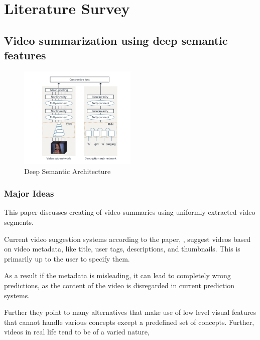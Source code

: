 
\chapter{Literature Survey} 
\label{Chapter1_2} 

\section{Video summarization using deep semantic features 
\texorpdfstring{\cite{otani_2016_video}}{}}

%			
			\begin{figure}[ht]
				\centering
					\includegraphics[width=0.5\textwidth]{P1Arch}
				\caption{Deep Semantic Architecture}
				\label{fig:p1arch}
			\end{figure}
			
			
			\subsection{Major Ideas}
				 This paper discusses creating of video summaries using uniformly extracted video segments.
				 
				 Current video suggestion systems according to the paper, \cite{otani_2016_video}, suggest videos based on video metadata, like title, user tags, descriptions, and thumbnails. This is primarily up to the user to specify them.

				As a result if the metadata is misleading, it can lead to completely wrong predictions, as the content of the video is disregarded in current prediction systems.
				
				Further they point to many alternatives that make use of low level visual features that cannot handle various concepts except a predefined set of concepts. Further, videos in real life tend to be of a varied nature, 
				
